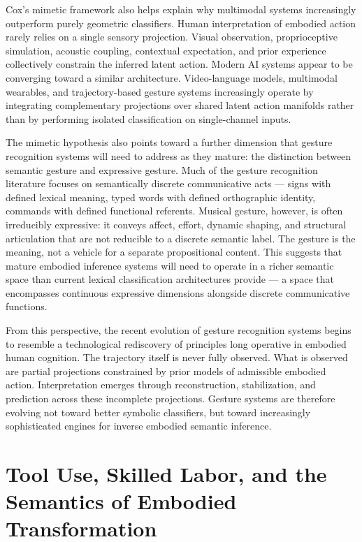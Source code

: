 \documentclass[11pt, a4paper]{article}
\theoremstyle{definition}
\begin{document}
Cox's mimetic framework also helps explain why multimodal systems increasingly outperform purely geometric classifiers. Human interpretation of embodied action rarely relies on a single sensory projection. Visual observation, proprioceptive simulation, acoustic coupling, contextual expectation, and prior experience collectively constrain the inferred latent action. Modern AI systems appear to be converging toward a similar architecture. Video-language models, multimodal wearables, and trajectory-based gesture systems increasingly operate by integrating complementary projections over shared latent action manifolds rather than by performing isolated classification on single-channel inputs.

The mimetic hypothesis also points toward a further dimension that gesture recognition systems will need to address as they mature: the distinction between semantic gesture and expressive gesture. Much of the gesture recognition literature focuses on semantically discrete communicative acts --- signs with defined lexical meaning, typed words with defined orthographic identity, commands with defined functional referents. Musical gesture, however, is often irreducibly expressive: it conveys affect, effort, dynamic shaping, and structural articulation that are not reducible to a discrete semantic label. The gesture is the meaning, not a vehicle for a separate propositional content. This suggests that mature embodied inference systems will need to operate in a richer semantic space than current lexical classification architectures provide --- a space that encompasses continuous expressive dimensions alongside discrete communicative functions.

From this perspective, the recent evolution of gesture recognition systems begins to resemble a technological rediscovery of principles long operative in embodied human cognition. The trajectory itself is never fully observed. What is observed are partial projections constrained by prior models of admissible embodied action. Interpretation emerges through reconstruction, stabilization, and prediction across these incomplete projections. Gesture systems are therefore evolving not toward better symbolic classifiers, but toward increasingly sophisticated engines for inverse embodied semantic inference.

\section{Tool Use, Skilled Labor, and the Semantics of Embodied Transformation}
\end{document}
